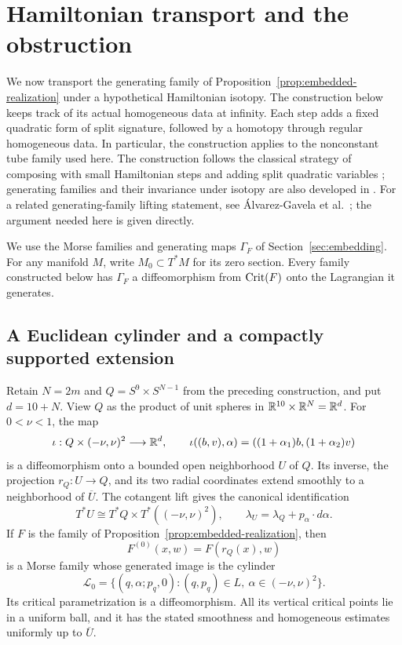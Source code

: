 \section{Hamiltonian transport and the obstruction}
\label{sec:transport}

We now transport the generating family of
Proposition~\ref{prop:embedded-realization} under a hypothetical Hamiltonian
isotopy.  The construction below keeps track of its actual homogeneous
data at infinity.  Each step adds a fixed quadratic form of split
signature, followed by a homotopy through regular homogeneous data.
In particular, the construction applies to the nonconstant tube family
used here. The construction follows the classical strategy of
composing with small Hamiltonian steps and adding split quadratic
variables \cite[Sections~1.3--1.7]{Sikorav1987}; generating families and their invariance
under isotopy are also developed in \cite{EG1998}.
For a related generating-family lifting statement, see
\mbox{\'{A}lvarez-Gavela} et al.~\cite[Lemma~3.23]{AIS2026}; the argument needed here is given directly.

We use the Morse families and generating maps $\Gamma_F$ of
Section~\ref{sec:embedding}. For any manifold $M$, write $M_0\subset T^*M$
for its zero section. Every family constructed below has
$\Gamma_F$ a diffeomorphism from $\operatorname{Crit}(F)$ onto the Lagrangian it
generates.

\subsection{A Euclidean cylinder and a compactly supported extension}

Retain $N=2m$ and $Q=S^9\times S^{N-1}$ from the preceding construction,
and put $d=10+N$.  View $Q$ as the product of unit spheres in
$\mathbb R^{10}\times\mathbb R^N=\mathbb R^d$.  For $0<\nu<1$, the map
\[
 \iota:Q\times(-\nu,\nu)^2\longrightarrow\mathbb R^d,
 \qquad
 \iota((b,v),\alpha)=((1+\alpha_1)b,(1+\alpha_2)v)
\]
is a diffeomorphism onto a bounded open neighborhood $U$ of $Q$.
Its inverse, the projection $r_Q:U\to Q$, and its two radial
coordinates extend smoothly to a neighborhood of $\overline U$.
The cotangent lift gives the canonical identification
\[
 T^*U\cong T^*Q\times T^*((-\nu,\nu)^2),
 \qquad
 \lambda_U=\lambda_Q+p_\alpha\cdot d\alpha.
\]
If $F$ is the family of Proposition~\ref{prop:embedded-realization},
then
\begin{equation}
 F^{(0)}(x,w)=F(r_Q(x),w)
 \label{eq:transport-initial-family}
\end{equation}
is a Morse family whose generated image is the cylinder
\begin{equation}
 \mathcal L_0=
 \{(q,\alpha;p_q,0):(q,p_q)\in L,\ \alpha\in(-\nu,\nu)^2\}.
 \label{eq:transport-cylinder}
\end{equation}
Its critical parametrization is a diffeomorphism.  All its vertical
critical points lie in a uniform ball, and it has the stated smoothness
and homogeneous estimates uniformly up to $\overline U$.

